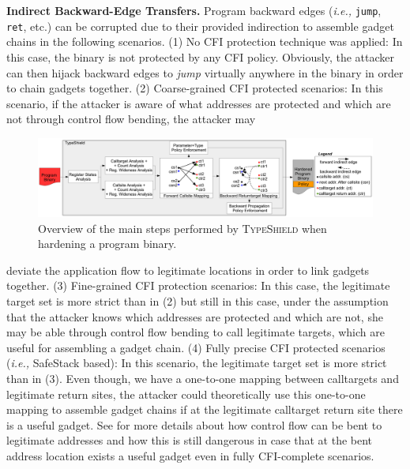 
\textbf{Indirect Backward-Edge Transfers.} 
Program backward edges (\textit{i.e.,} \texttt{jump}, \texttt{ret}, etc.) can be corrupted due to their provided indirection to assemble gadget chains in the following scenarios.
(1) No CFI protection technique was applied: In this case, the binary is not protected by any CFI policy. Obviously, the attacker can then hijack backward edges to \textit{jump} virtually 
anywhere in the binary in order to chain gadgets together.
(2) Coarse-grained CFI protected scenarios: In this scenario, if the attacker is aware of what addresses are protected and which are not through control flow bending, 
the attacker may 
\begin{figure}[t!]
\centering
   \includegraphics[width=.82\textwidth]{figures/overview.pdf}
   \vspace{-.25cm}
    \caption{Overview of the main steps performed by \textsc{TypeShield} when hardening a program binary.}
    \label{System overview.}
    \vspace{-.5cm}
 \end{figure}
deviate
the application flow to legitimate locations in order to link gadgets together.
(3) Fine-grained CFI protection scenarios: In this case, the legitimate target set is more strict than in (2) but still in this case, under the assumption that the attacker knows
which addresses are protected and which are not, she may be able through control flow bending to call legitimate targets, which are useful for assembling a gadget chain.
(4) Fully precise CFI protected scenarios (\textit{i.e.,} SafeStack \cite{volodymyr:cpi} based): In this scenario, the legitimate target set is more strict than in (3). Even though, we 
have a one-to-one mapping 
between calltargets and legitimate return sites, the attacker could theoretically use this one-to-one mapping to assemble gadget chains if at the legitimate calltarget return site there is a useful gadget. 
See \cite{carlini:bending} for more details about how control flow can be bent to legitimate addresses and how this is still dangerous in 
case that at the bent address location exists a useful gadget even in fully CFI-complete scenarios. 

